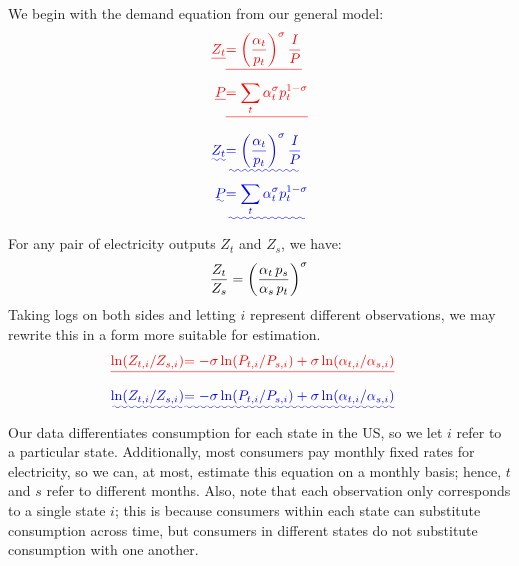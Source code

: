 \documentclass[11pt,a4paper,leqno]{extarticle}
\providecommand{\DIFadd}[1]{{\protect\color{blue}\uwave{#1}}} %
\providecommand{\DIFdel}[1]{{\protect\color{red}\sout{#1}}}                      %
\providecommand{\DIFaddbegin}{} %
\providecommand{\DIFaddend}{} %
\providecommand{\DIFdelbegin}{} %
\providecommand{\DIFdelend}{} %
\begin{document}
	
	We begin with the demand equation from our general model:
	\DIFdelbegin \begin{eqnarray*}
		\DIFdel{Z_t }&\DIFdel{= \left(\frac{\alpha_t}{p_t} \right)^\sigma \frac{I}{P} }\\
		\DIFdel{P }&\DIFdel{= \sum_t \alpha_t^\sigma p_t^{1-\sigma}
	}\end{eqnarray*}%
	\DIFdelend \DIFaddbegin \begin{align}
	\DIFadd{Z_t }&\DIFadd{= \left(\frac{\alpha_t}{p_t} \right)^\sigma \frac{I}{P} }\\
	\DIFadd{P }&\DIFadd{= \sum_t \alpha_t^\sigma p_t^{1-\sigma}
	}\end{align}\DIFaddend 
	For any pair of electricity outputs $Z_t$ and $Z_s$, we have:
	$$\frac{Z_t}{Z_s} = \left(\frac{\alpha_t \, p_s}{\alpha_s \, p_t} \right)^\sigma \\$$
	Taking logs on both sides and letting $i$ represent different observations, we may rewrite this in a form more suitable for estimation. 
	\DIFdelbegin \begin{eqnarray*}
		\DIFdel{\ln (Z_{t, i} / Z_{ s, i}) }&\DIFdel{= -\sigma \ln (P_{t,i} / P_{s,i}) + \sigma \ln (\alpha_{t,i} / \alpha_{s,i}) 
	}\end{eqnarray*}%
	\DIFdelend \DIFaddbegin \begin{align}
	\DIFadd{\ln (Z_{t, i} / Z_{ s, i}) }&\DIFadd{= -\sigma \ln (P_{t,i} / P_{s,i}) + \sigma \ln (\alpha_{t,i} / \alpha_{s,i}) 
	}\end{align}\DIFaddend 
	Our data differentiates consumption for each state in the US, so we let $i$ refer to a particular state. Additionally, most consumers pay monthly fixed rates for electricity, so we can, at most, estimate this equation on a monthly basis; hence, $t$ and $s$ refer to different months. Also, note that each observation only corresponds to a single state $i$; this is because consumers within each state can substitute consumption across time, but consumers in different states do not substitute consumption with one another. 
	
\end{document}
